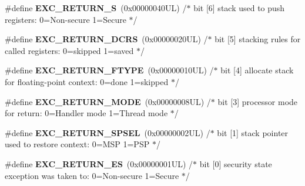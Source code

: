 \begin{DoxyCompactItemize}
\item 
\mbox{\label{group___c_m_s_i_s___core___n_v_i_c_functions_ga88711355d0196b1ffeb18c33e2c95360}} 
\#define {\bfseries E\+X\+C\+\_\+\+R\+E\+T\+U\+R\+N\+\_\+S}~(0x00000040\+U\+L)     /$\ast$ bit \mbox{[}6\mbox{]} stack used to push registers\+: 0=\+Non-\/secure 1=\+Secure          $\ast$/
\item 
\mbox{\label{group___c_m_s_i_s___core___n_v_i_c_functions_ga0a0f2c03b4aef2c02bdae044bda1324b}} 
\#define {\bfseries E\+X\+C\+\_\+\+R\+E\+T\+U\+R\+N\+\_\+\+D\+C\+RS}~(0x00000020\+U\+L)     /$\ast$ bit \mbox{[}5\mbox{]} stacking rules for called registers\+: 0=skipped 1=saved       $\ast$/
\item 
\mbox{\label{group___c_m_s_i_s___core___n_v_i_c_functions_ga342b51c3eec59822bf206e24ef881a9e}} 
\#define {\bfseries E\+X\+C\+\_\+\+R\+E\+T\+U\+R\+N\+\_\+\+F\+T\+Y\+PE}~(0x00000010\+U\+L)     /$\ast$ bit \mbox{[}4\mbox{]} allocate stack for floating-\/point context\+: 0=done 1=skipped  $\ast$/
\item 
\mbox{\label{group___c_m_s_i_s___core___n_v_i_c_functions_gabb65f847769a7807395b2739cc9702d0}} 
\#define {\bfseries E\+X\+C\+\_\+\+R\+E\+T\+U\+R\+N\+\_\+\+M\+O\+DE}~(0x00000008\+U\+L)     /$\ast$ bit \mbox{[}3\mbox{]} processor mode for return\+: 0=\+Handler mode 1=\+Thread mode      $\ast$/
\item 
\mbox{\label{group___c_m_s_i_s___core___n_v_i_c_functions_ga686922b26c29eac540f53a6213627466}} 
\#define {\bfseries E\+X\+C\+\_\+\+R\+E\+T\+U\+R\+N\+\_\+\+S\+P\+S\+EL}~(0x00000002\+U\+L)     /$\ast$ bit \mbox{[}1\mbox{]} stack pointer used to restore context\+: 0=\+M\+S\+P 1=\+P\+S\+P           $\ast$/
\item 
\mbox{\label{group___c_m_s_i_s___core___n_v_i_c_functions_gac939dbf69d3063c76a28516a4ae84db7}} 
\#define {\bfseries E\+X\+C\+\_\+\+R\+E\+T\+U\+R\+N\+\_\+\+ES}~(0x00000001\+U\+L)     /$\ast$ bit \mbox{[}0\mbox{]} security state exception was taken to\+: 0=\+Non-\/secure 1=\+Secure $\ast$/
\item 

\end{DoxyCompactItemize}
